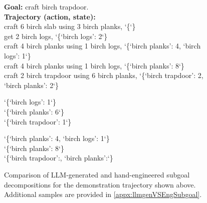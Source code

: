 \begin{figure}[!t]
\centering

\begin{tcolorbox}[
    colback=blue!2,
    colframe=blue!40,
    colbacktitle=blue!10,
    coltitle=black,
    title=Provided Demonstration Trajectory,
    boxrule=0.3pt,
    sharp corners,
    enhanced jigsaw,
    fonttitle=\bfseries
]
\ttfamily\raggedright
{\bfseries Goal:} craft birch trapdoor.\\[0.2em]
{\bfseries Trajectory (action, state):}\\[0.2em]

craft 6 birch slab using 3 birch planks, \char`\{\char`\}\\
get 2 birch logs, \char`\{`birch logs': 2\char`\}\\
craft 4 birch planks using 1 birch logs, \char`\{`birch planks': 4, `birch logs': 1\char`\}\\
craft 4 birch planks using 1 birch logs, \char`\{`birch planks': 8\char`\}\\
craft 2 birch trapdoor using 6 birch planks, \char`\{`birch trapdoor': 2, `birch planks': 2\char`\}
\end{tcolorbox}
\begin{tcbraster}[
  raster equal height,
  raster columns=2,
  raster width=\textwidth,
  raster column skip=3mm,
  boxrule=0.3pt,
  colback=blue!2,
  colframe=blue!40,
  colbacktitle=blue!10,
  coltitle=black,
  enhanced jigsaw,
  sharp corners,
  fonttitle=\bfseries
]


\begin{tcolorbox}[title=LLM-Generated Subgoals, width=0.45\textwidth]
\ttfamily\raggedright
\char`\{`birch logs': 1\char`\}\\
\char`\{`birch planks': 6\char`\}\\
\char`\{`birch trapdoor': 1\char`\}
\end{tcolorbox}
\begin{tcolorbox}[title=Hand-Engineered Subgoals, width=0.53\textwidth]
\ttfamily\raggedright
\char`\{`birch planks': 4, `birch logs': 1\char`\}\\
\char`\{`birch planks': 8\char`\}\\
\char`\{`birch trapdoor':\;, `birch planks':\;\char`\}
\end{tcolorbox}
\end{tcbraster}

\caption{Comparison of LLM-generated and hand-engineered subgoal decompositions for the demonstration trajectory shown above. Additional samples are provided in \cref{appx:llmgenVSEngSubgoal}.}
\label{fig:subgoal_seq}
\end{figure}